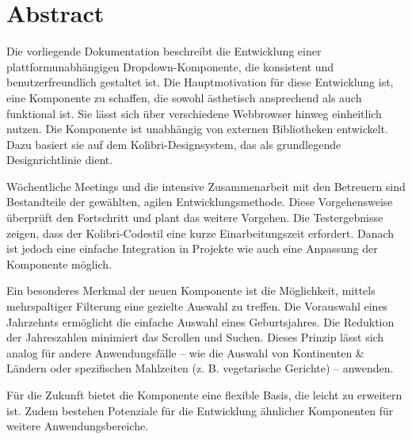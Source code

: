 \chapter*{Abstract}

Die vorliegende Dokumentation beschreibt die Entwicklung einer plattformunabhängigen Dropdown-Komponente, die konsistent und benutzerfreundlich gestaltet ist. 
Die Hauptmotivation für diese Entwicklung ist, eine Komponente zu schaffen, die sowohl ästhetisch ansprechend als auch funktional ist. 
Sie lässt sich über verschiedene Webbrowser hinweg einheitlich nutzen. 
Die Komponente ist unabhängig von externen Bibliotheken entwickelt. 
Dazu basiert sie auf dem Kolibri-Designsystem, das als grundlegende Designrichtlinie dient. 

Wöchentliche Meetings und die intensive Zusammenarbeit mit den Betreuern sind Bestandteile der gewählten, agilen Entwicklungsmethode. 
Diese Vorgehensweise überprüft den Fortschritt und plant das weitere Vorgehen. 
Die Testergebnisse zeigen, dass der Kolibri-Codestil eine kurze Einarbeitungszeit erfordert. 
Danach ist jedoch eine einfache Integration in Projekte wie auch eine Anpassung der Komponente möglich. 

Ein besonderes Merkmal der neuen Komponente ist die Möglichkeit, mittels mehrspaltiger Filterung eine gezielte Auswahl zu treffen. 
Die Vorauswahl eines Jahrzehnts ermöglicht die einfache Auswahl eines Geburtsjahres. 
Die Reduktion der Jahreszahlen minimiert das Scrollen und Suchen. 
Dieses Prinzip lässt sich analog für andere Anwendungsfälle – wie die Auswahl von Kontinenten \& Ländern oder spezifischen Mahlzeiten (z. B. vegetarische Gerichte) – anwenden. 

Für die Zukunft bietet die Komponente eine flexible Basis, die leicht zu erweitern ist. 
Zudem bestehen Potenziale für die Entwicklung ähnlicher Komponenten für weitere Anwendungsbereiche. 
